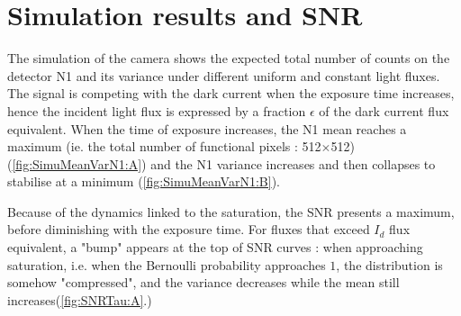 
\section{Simulation results and SNR}

The simulation of the camera shows the expected total number of counts on the detector N1 and its variance  under different uniform and constant light fluxes. The signal is competing with the dark current when the exposure time increases, hence the incident light flux is expressed by a fraction $\epsilon $ of the dark current flux equivalent. When the time of exposure increases, the N1 mean reaches a maximum (ie. the total number of functional pixels : 512$\times$512) (\ref{fig:SimuMeanVarN1:A}) and the N1 variance increases and then collapses to stabilise at a minimum (\ref{fig:SimuMeanVarN1:B}). \par

Because of the dynamics linked to the saturation, the SNR presents a maximum, before diminishing with the exposure time.
For fluxes that exceed $I_{d}$ flux equivalent, a "bump" appears at the top of SNR curves : when approaching saturation, i.e. when the Bernoulli probability approaches $1$, the distribution is somehow "compressed", and the variance decreases while the mean still increases(\ref{fig:SNRTau:A}.)

